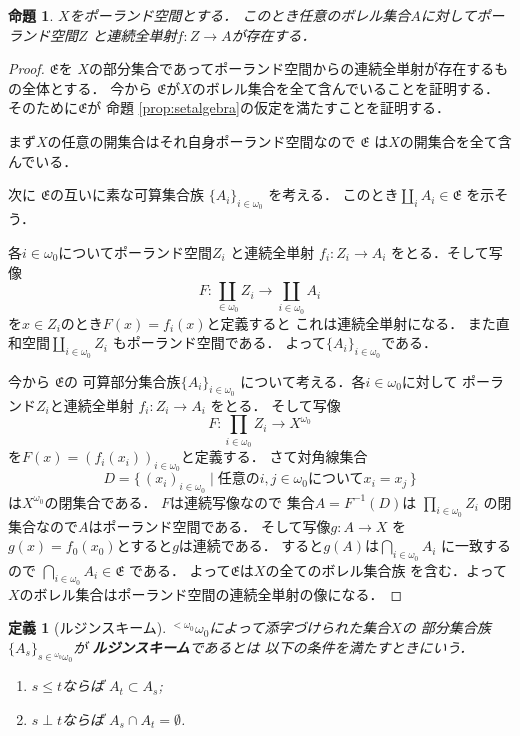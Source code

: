 \documentclass[leqno, 12pt]{jsarticle}
\newtheorem{prop}[thm]{命題}
\newtheorem{df}[thm]{定義}
\newcommand{\myomega}{\omega_{0}}
\newcommand{\mybairetb}{{}^{<\myomega}\myomega}
\newcommand{\mybaire}{{}^{\myomega}\myomega}
\begin{document}
\begin{prop}\label{prop:ZtoA}
$X$をポーランド空間とする．
このとき任意のボレル集合$A$に対してポーランド空間$Z$
と連続全単射$f\colon Z\to A$が存在する．
\end{prop}
\begin{proof}
$\mathfrak{E}$を
$X$の部分集合であってポーランド空間からの連続全単射が存在するもの全体とする．
今から
$\mathfrak{E}$が$X$のボレル集合を全て含んでいることを証明する．
そのために$\mathfrak{E}$が
命題 \ref{prop:setalgebra}の仮定を満たすことを証明する．

まず$X$の任意の開集合はそれ自身ポーランド空間なので
$\mathfrak{E}$
は$X$の開集合を全て含んでいる．

次に
$\mathfrak{E}$の互いに素な可算集合族
$\{A_{i}\}_{i\in \myomega}$
を考える．
このとき$\coprod_{i}A_{i}\in \mathfrak{E}$
を示そう．

各$i\in \myomega$についてポーランド空間$Z_{i}$
と連続全単射
$f_{i}\colon Z_{i}\to A_{i}$
をとる．そして写像
\[
F\colon \coprod_{\in \myomega}Z_{i}
\to \coprod_{i\in \myomega}A_{i}
\]
を$x\in Z_{i}$のとき$F(x)=f_{i}(x)$と定義すると
これは連続全単射になる．
また直和空間$\coprod_{i\in \myomega}Z_{i}$
もポーランド空間である．
よって$\{A_{i}\}_{i\in \myomega}$である．

今から
$\mathfrak{E}$の
可算部分集合族$\{A_{i}\}_{i\in \myomega}$
について考える．各$i\in \myomega$に対して
ポーランド$Z_{i}$と連続全単射
$f_{i}\colon Z_{i}\to A_{i}$
をとる．
そして写像
\[
F\colon \prod_{i\in \myomega}Z_{i}\to X^{\myomega}
\]
を$F(x)=(f_{i}(x_{i}))_{i\in \myomega}$と定義する．
さて対角線集合
\[
D=\{\, (x_{i})_{i\in \myomega}\mid 
\text{任意の$i, j\in \myomega$について$x_{i}=x_{j}$}\, \}
\]
は$X^{\myomega}$の閉集合である．
$F$は連続写像なので
集合$A=F^{-1}(D)$は
$\prod_{i\in \myomega}Z_{i}$
の閉集合なので$A$はポーランド空間である．
そして写像$g\colon A\to X$
を$g(x)=f_{0}(x_{0})$とすると$g$は連続である．
すると$g(A)$は$\bigcap_{i\in \myomega}A_{i}$
に一致するので
$\bigcap_{i\in \myomega}A_{i}\in \mathfrak{E}$
である．
よって$\mathfrak{E}$は$X$の全てのボレル集合族
を含む．よって$X$のボレル集合はポーランド空間の連続全単射の像になる．
\end{proof}

\begin{df}[ルジンスキーム]\label{df:lusin}
$\mybairetb$によって添字づけられた集合$X$の
部分集合族$\{A_{s}\}_{s\in \mybaire}$が
\textbf{ルジンスキーム}であるとは
以下の条件を満たすときにいう．
\begin{enumerate}
\item 
$s\le t$ならば
$A_{t}\subset A_{s}$;
\item 
$s\perp t$ならば
$A_{s}\cap A_{t}=\emptyset$.


\end{enumerate}
\end{df}
\end{document}
